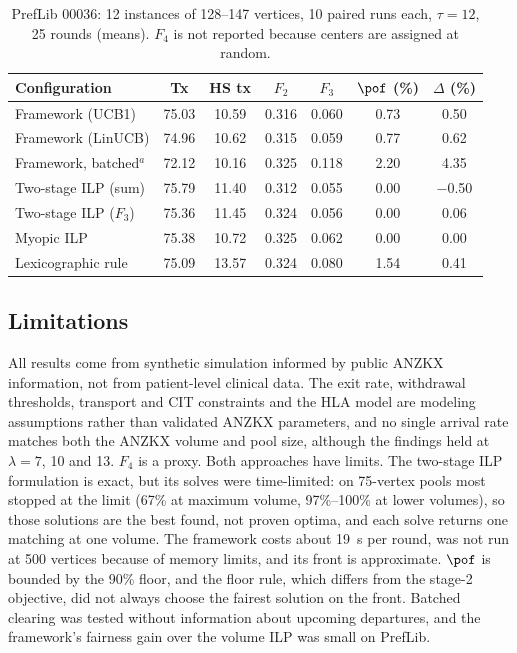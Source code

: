 \documentclass[journal]{IEEEtran}
\begin{document}
\begin{table}[!htbp]
\caption{PrefLib 00036: 12 instances of 128--147 vertices, 10 paired
runs each, $\tau = 12$, 25 rounds (means). $F_4$ is not reported
because centers are assigned at random.}
\label{tab:ood}
\begin{tabular}{lcccccc}
\toprule
Configuration & Tx & HS tx & $F_2$ & $F_3$ & $\pof$ (\%) & $\Delta$ (\%) \\
\midrule
Framework (UCB1)        & 75.03 & 10.59 & 0.316 & 0.060 & 0.73 & 0.50 \\
Framework (LinUCB)      & 74.96 & 10.62 & 0.315 & 0.059 & 0.77 & 0.62 \\
Framework, batched$^{a}$ & 72.12 & 10.16 & 0.325 & 0.118 & 2.20 & 4.35 \\
Two-stage ILP (sum)     & 75.79 & 11.40 & 0.312 & 0.055 & 0.00 & $-$0.50 \\
Two-stage ILP ($F_3$)   & 75.36 & 11.45 & 0.324 & 0.056 & 0.00 & 0.06 \\
Myopic ILP              & 75.38 & 10.72 & 0.325 & 0.062 & 0.00 & 0.00 \\
Lexicographic rule      & 75.09 & 13.57 & 0.324 & 0.080 & 1.54 & 0.41 \\
\bottomrule
\end{tabular}
\end{table}

\subsection{Limitations}
\label{sec:results:lim}
All results come from synthetic simulation informed by public ANZKX
information, not from patient-level clinical data. The exit rate,
withdrawal thresholds, transport and CIT constraints and the HLA model
are modeling assumptions rather than validated ANZKX parameters, and no
single arrival rate matches both the ANZKX volume and pool size,
although the findings held at $\lambda = 7$, 10 and 13. $F_4$ is a
proxy. Both approaches have limits. The two-stage ILP formulation is exact, but its
solves were time-limited: on 75-vertex pools most stopped at the limit
(67\% at maximum volume, 97\%--100\% at lower volumes), so those
solutions are the best found, not proven optima, and each solve returns
one matching at one volume. The framework costs about 19~s per round,
was not run at 500 vertices because of memory limits, and its front is
approximate. $\pof$ is bounded by the 90\% floor, and the floor rule,
which differs from the stage-2 objective, did not always choose the
fairest solution on the front. Batched clearing was tested without
information about upcoming departures, and the framework's fairness
gain over the volume ILP was small on PrefLib.
\end{document}
